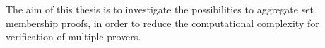 The aim of this thesis is to investigate the possibilities to aggregate set membership proofs, in order to reduce the computational complexity for verification of multiple provers.










